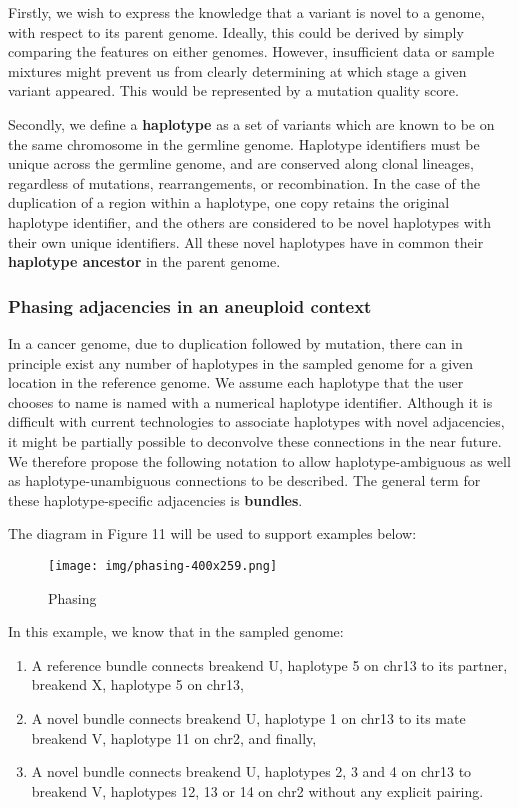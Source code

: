 \documentclass[8pt]{article}
\begin{document}
Firstly, we wish to express the knowledge that a variant is novel to a genome, with respect to its parent genome. Ideally, this could be derived by simply comparing the features on either genomes. However, insufficient data or sample mixtures might prevent us from clearly determining at which stage a given variant appeared. This would be represented by a mutation quality score.

Secondly, we define a \textbf{haplotype} as a set of variants which are known to be on the same chromosome in the germline genome. Haplotype identifiers must be unique across the germline genome, and are conserved along clonal lineages, regardless of mutations, rearrangements, or recombination. In the case of the duplication of a region within a haplotype, one copy retains the original haplotype identifier, and the others are considered to be novel haplotypes with their own unique identifiers. All these novel haplotypes have in common their \textbf{haplotype ancestor} in the parent genome.

\subsubsection{Phasing adjacencies in an aneuploid context}
In a cancer genome, due to duplication followed by mutation, there can in principle exist any number of haplotypes in the sampled genome for a given location in the reference genome. We assume each haplotype that the user chooses to name is named with a numerical haplotype identifier. Although it is difficult with current technologies to associate haplotypes with novel adjacencies, it might be partially possible to deconvolve these connections in the near future. We therefore propose the following notation to allow haplotype-ambiguous as well as haplotype-unambiguous connections to be described. The general term for these haplotype-specific adjacencies is \textbf{bundles}.

The diagram in Figure 11 will be used to support examples below:

\begin{figure}[ht]
\centering
\texttt{[image: img/phasing-400x259.png]}
\caption{Phasing}
\end{figure}

In this example, we know that in the sampled genome:

\begin{enumerate}
  \item A reference bundle connects breakend U, haplotype 5 on chr13 to its partner, breakend X, haplotype 5 on chr13,
  \item A novel bundle connects breakend U, haplotype 1 on chr13 to its mate breakend V, haplotype 11 on chr2, and finally,
  \item A novel bundle connects breakend U, haplotypes 2, 3 and 4 on chr13 to breakend V, haplotypes 12, 13 or 14 on chr2 without any explicit pairing.
\end{enumerate}
\end{document}
